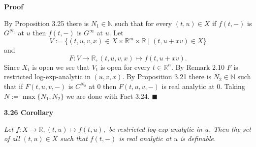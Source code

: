 \documentclass[12pt]{article}
\def\vs{\vspace}
\begin{document}
\vs{0.3cm}
{\bf Proof}

\vs{0.1cm}
By Proposition 3.25 there is $N_1 \in \mathbb{N}$ such that for every $(t,u) \in X$ if $f(t,-)$ is $G^{N_1}$ at $u$ then $f(t,-)$ is $G^{\infty}$ at $u$. Let 
$$V:=\{(t,u,v,x) \in X \times \mathbb{R}^m \times \mathbb{R} \mid (t,u+xv) \in X\}$$
and
$$F:V \to \mathbb{R}, (t,u,v,x)\mapsto f(t,u+xv).$$ 
Since $X_t$ is open we see that $V_t$ is open for every $t \in \mathbb{R}^n$. By Remark 2.10 $F$ is restricted log-exp-analytic in $(u,v,x)$. By Proposition 3.21 there is $N_2 \in \mathbb{N}$ such that if $F(t,u,v,-)$ is $C^{N_2}$ at $0$ then $F(t,u,v,-)$ is real analytic at $0$. Taking $N:=\max\{N_1,N_2\}$ we are done with Fact 3.24.
\hfill$\blacksquare$

\vs{0.5cm}
{\bf3.26 Corollary}

\vs{0.1cm}
{\it Let $f:X \to \mathbb{R}, (t,u) \mapsto f(t,u),$ be restricted log-exp-analytic in $u$. Then the set of all $(t,u) \in X$ such that $f(t,-)$ is real analytic at $u$ is definable.}
\end{document}

